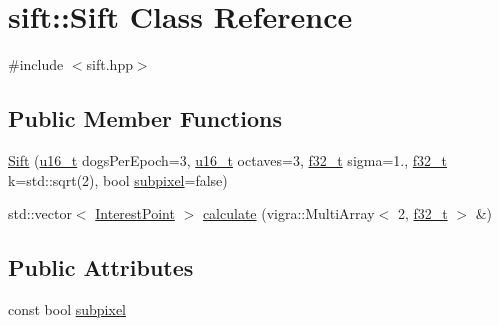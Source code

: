 \hypertarget{classsift_1_1Sift}{}\section{sift\+:\+:Sift Class Reference}
\label{classsift_1_1Sift}


{\ttfamily \#include $<$sift.\+hpp$>$}

\subsection*{Public Member Functions}
\begin{DoxyCompactItemize}
\item 
\hyperlink{classsift_1_1Sift_a782dc76e2fcca6e04cd3cb2398e06eb0}{Sift} (\hyperlink{types_8hpp_a4f53bd979bf45b1ce27e5f43e3a0d33b}{u16\+\_\+t} dogs\+Per\+Epoch=3, \hyperlink{types_8hpp_a4f53bd979bf45b1ce27e5f43e3a0d33b}{u16\+\_\+t} octaves=3, \hyperlink{types_8hpp_a37279f6a792de218cef11dff445d532a}{f32\+\_\+t} sigma=1., \hyperlink{types_8hpp_a37279f6a792de218cef11dff445d532a}{f32\+\_\+t} k=std\+::sqrt(2), bool \hyperlink{classsift_1_1Sift_ab083661626a1f1f50ceafaf3134f573d}{subpixel}=false)
\item 
std\+::vector$<$ \hyperlink{classsift_1_1InterestPoint}{Interest\+Point} $>$ \hyperlink{classsift_1_1Sift_a55e96b5f3bf9e340633aa874dbc18efe}{calculate} (vigra\+::\+Multi\+Array$<$ 2, \hyperlink{types_8hpp_a37279f6a792de218cef11dff445d532a}{f32\+\_\+t} $>$ \&)
\end{DoxyCompactItemize}
\subsection*{Public Attributes}
\begin{DoxyCompactItemize}
\item 
const bool \hyperlink{classsift_1_1Sift_ab083661626a1f1f50ceafaf3134f573d}{subpixel}
\end{DoxyCompactItemize}
